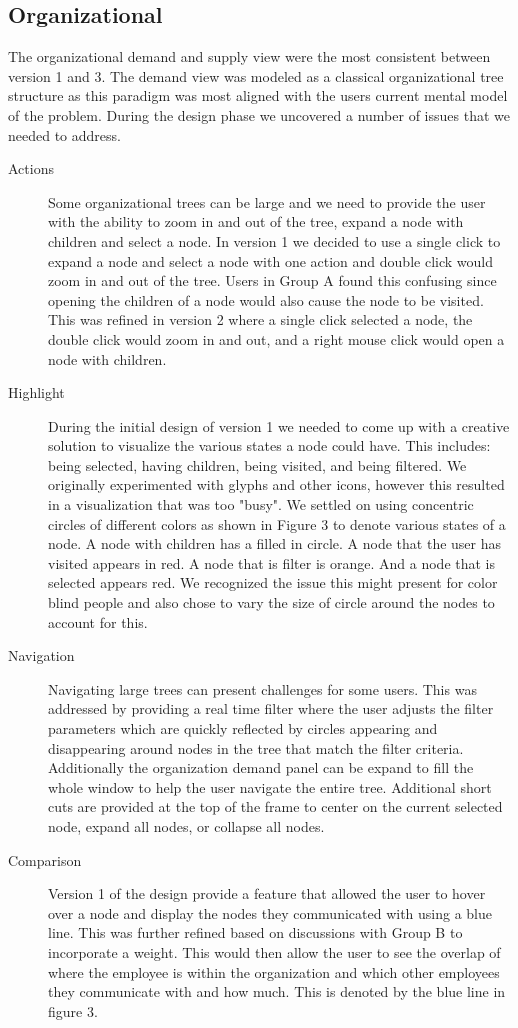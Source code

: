 \documentclass[journal]{vgtc}                %
\begin{document}
\subsection{Organizational}
The organizational demand and supply view were the most consistent between version 1 and 3.  The demand view was modeled as a classical organizational tree structure as this paradigm was most aligned with the users current mental model of the problem.  During the design phase we uncovered a number of issues that we needed to address.
\begin{description}
	\item[Actions] Some organizational trees can be large and we need to provide the user with the ability to zoom in and out of the tree, expand a node with children and select a node.  In version 1 we decided to use a single click to expand a node and select a node with one action and double click would zoom in and out of the tree.  Users in Group A found this confusing since opening the children of a node would also cause the node to be visited.  This was refined in version 2 where a single click selected a node, the double click would zoom in and out, and a right mouse click would open a node with children.  
	\item [Highlight] During the initial design of version 1 we needed to come up with a creative solution to visualize the various states a node could have.  This includes: being selected, having children, being visited, and being filtered.  We originally experimented with glyphs and other icons, however this resulted in a visualization that was too "busy".  We settled on using concentric circles of different colors as shown in Figure 3 to denote various states of a node.  A node with children has a filled in circle.  A node that the user has visited appears in red.  A node that is filter is orange. And a node that is selected appears red.  We recognized the issue this might present for color blind people and also chose to vary the size of circle around the nodes to account for this.
	\item [Navigation] Navigating large trees can present challenges for some users.  This was addressed by providing a real time filter where the user adjusts the filter parameters which are quickly reflected by circles appearing and disappearing around nodes in the tree that match the filter criteria.  Additionally the organization demand panel can be expand to fill the whole window to help the user navigate the entire tree.  Additional short cuts are provided at the top of the frame to center on the current selected node, expand all nodes, or collapse all nodes.
	\item [Comparison] Version 1 of the design provide a feature that allowed the user to hover over a node and display the nodes they communicated with using a blue line.  This was further refined based on discussions with Group B to incorporate a weight.  This would then allow the user to see the overlap of where the employee is within the organization and which other employees they communicate with and how much.  This is denoted by the blue line in figure 3.
\end{description}
\end{document}
